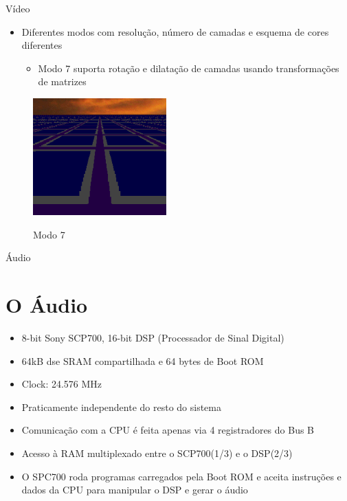 \documentclass[xcolor=svgnames,handout]{beamer}
\begin{document}
\begin{frame}{Vídeo}
    \begin{itemize}
      \item{Diferentes modos com resolução, número de camadas e esquema de cores diferentes}
      \begin{itemize}
        \item{Modo 7 suporta rotação e dilatação de camadas usando transformações de matrizes}
      \end{itemize}
    \end{itemize}
  \begin{figure}
  \begin{center}
    \includegraphics[height=4.5cm, width=\textwidth, keepaspectratio]{Mode_7.png}
    \label{fig:}
    \caption{Modo 7}
  \end{center}
\end{figure}
\end{frame}


\begin{frame}{Áudio}
\section{O Áudio}
\begin{itemize}
  \item{8-bit Sony SCP700, 16-bit DSP (Processador de Sinal Digital)}
  \item{64kB dse SRAM compartilhada e 64 bytes de Boot ROM}
  \item{Clock: 24.576 MHz}
  \item{Praticamente independente do resto do sistema}
  \item{Comunicação com a CPU é feita apenas via 4 registradores do Bus B}
  \item{Acesso à RAM multiplexado entre o SCP700(1/3) e o DSP(2/3)}
  \item{O SPC700 roda programas carregados pela Boot ROM e aceita instruções e dados da CPU para manipular o DSP e gerar o áudio}
\end{itemize}
\end{frame}
\end{document}

